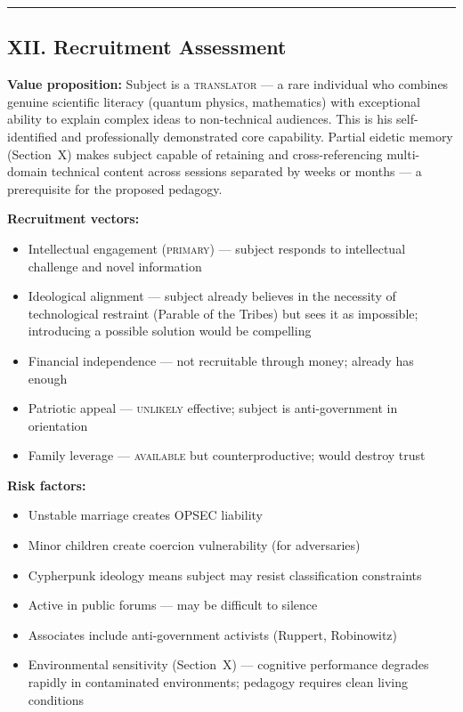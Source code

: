 \vspace{1cm}\hrule\vspace{1cm}

\subsection*{XII. Recruitment Assessment}
\label{interlude:recruitment-assessment}

\textbf{Value proposition:} Subject is a \textsc{translator} --- a rare individual who combines genuine scientific literacy (quantum physics, mathematics) with exceptional ability to explain complex ideas to non-technical audiences. This is his self-identified and professionally demonstrated core capability. Partial eidetic memory (Section~X) makes subject capable of retaining and cross-referencing multi-domain technical content across sessions separated by weeks or months --- a prerequisite for the proposed pedagogy.

\textbf{Recruitment vectors:}

\begin{itemize}[nosep]
\item Intellectual engagement (\textsc{primary}) --- subject responds to intellectual challenge and novel information
\item Ideological alignment --- subject already believes in the necessity of technological restraint (Parable of the Tribes) but sees it as impossible; introducing a possible solution would be compelling
\item Financial independence --- not recruitable through money; already has enough
\item Patriotic appeal --- \textsc{unlikely} effective; subject is anti-government in orientation
\item Family leverage --- \textsc{available} but counterproductive; would destroy trust
\end{itemize}

\textbf{Risk factors:}

\begin{itemize}[nosep]
\item Unstable marriage creates OPSEC liability
\item Minor children create coercion vulnerability (for adversaries)
\item Cypherpunk ideology means subject may resist classification constraints
\item Active in public forums --- may be difficult to silence
\item Associates include anti-government activists (Ruppert, Robinowitz)
\item Environmental sensitivity (Section~X) --- cognitive performance degrades rapidly in contaminated environments; pedagogy requires clean living conditions
\end{itemize}

